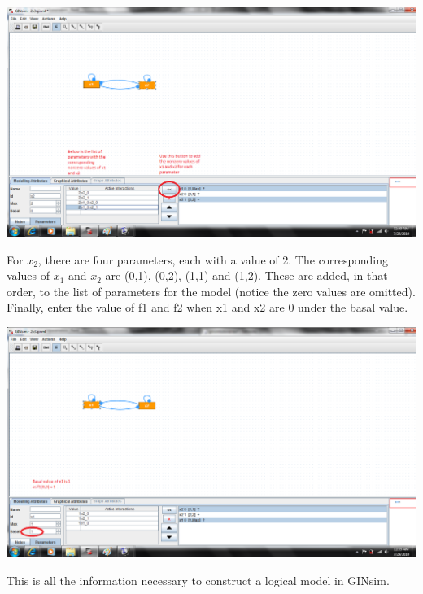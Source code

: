 \documentclass[12pt]{article}
\begin{document}
\begin{center}
\includegraphics[scale=.43]{addparameters.png}
\end{center}

For $x_{2}$, there are four parameters, each with a value of 2. The corresponding values of $x_{1}$ and $x_{2}$ are (0,1), (0,2), (1,1) and (1,2). These are added, in that order, to the list of parameters for the model (notice the zero values are omitted). Finally, enter the value of f1 and f2 when x1 and x2 are 0 under the 
basal value.

\begin{center}
\includegraphics[scale=.43]{basal.png}
\end{center}

This is all the information necessary to construct a logical model in GINsim.
\end{document}
